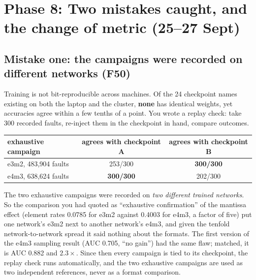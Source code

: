 \section{Phase 8: Two mistakes caught, and the change of metric (25--27 Sept)}
\label{sec:phase-metric}

\subsection{Mistake one: the campaigns were recorded on different networks (F50)}
Training is not bit-reproducible across machines. Of the 24 checkpoint names existing on both the laptop and the cluster, \textbf{none} has identical weights, yet accuracies agree within a few tenths of a point. You wrote a replay check: take 300 recorded faults, re-inject them in the checkpoint in hand, compare outcomes.
\begin{center}
\small
\begin{tabular}{lcc}
\toprule
exhaustive campaign & agrees with checkpoint A & agrees with checkpoint B \\
\midrule
e3m2, 483{,}904 faults & 253/300 & \textbf{300/300} \\
e4m3, 638{,}624 faults & \textbf{300/300} & 202/300 \\
\bottomrule
\end{tabular}
\end{center}
The two exhaustive campaigns were recorded on \emph{two different trained networks}. So the comparison you had quoted as ``exhaustive confirmation'' of the mantissa effect (element rates 0.0785 for e3m2 against 0.4003 for e4m3, a factor of five) put one network's e3m2 next to another network's e4m3, and given the tenfold network-to-network spread it said nothing about the formats.
The first version of the e4m3 sampling result (AUC 0.705, ``no gain'') had the same flaw; matched, it is AUC 0.882 and $2.3\times$. Since then every campaign is tied to its checkpoint, the replay check runs automatically, and the two exhaustive campaigns are used as two independent references, never as a format comparison.

